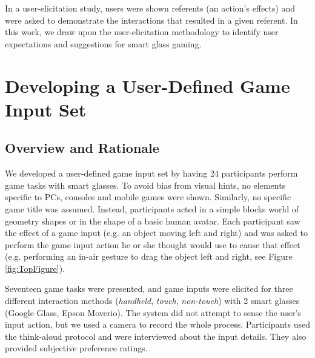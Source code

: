 \documentclass{sigchi}
\begin{document}
    In a user-elicitation study, users were shown referents (an action's effects) and were asked to demonstrate the interactions that resulted in a given referent\cite{Wobbrock:2009:UGS:1518701.1518866}. In this work, we draw upon the user-elicitation methodology to identify user expectations and suggestions for smart glass gaming.

\section{Developing a User-Defined Game Input Set}


    \subsection {Overview and Rationale}


    We developed a user-defined game input set by having 24 participants perform game tasks with smart glasses. To avoid bias from visual hints\cite{Epps:2006:SHS:1125451.1125601}, no elements specific to PCs, consoles and mobile games were shown. Similarly, no specific game title was assumed. Instead, participants acted in a simple blocks world of geometry shapes or in the shape of a basic human avatar. Each participant saw the effect of a game input (e.g. an object moving left and right) and was asked to perform the game input action he or she thought would use to cause that effect (e.g. performing an in-air gesture to drag the object left and right, see Figure \ref{fig:TopFigure}). 

    Seventeen game tasks were presented, and game inputs were elicited for three different interaction methods (\emph{handheld}, \emph{touch}, \emph{non-touch}) with 2 smart glasses (Google Glass, Epson Moverio). The system did not attempt to sense the user's input action, but we used a camera to record the whole process. Participants used the think-aloud protocol and were interviewed about the input details. They also provided subjective preference ratings.
\end{document}
